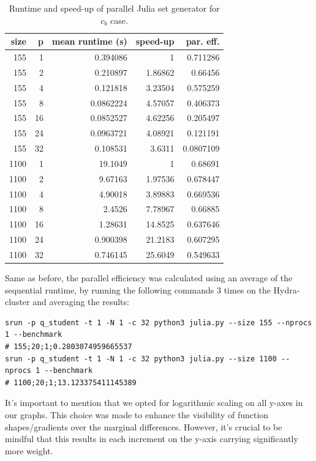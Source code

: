 \documentclass[a4paper,%
11pt,%
DIV12,
headsepline,%
headings=normal,
]{scrartcl}
\begin{document}
\begin{table}[htb!]
 \centering 
\caption{\label{tab:runtime_cb}Runtime and speed-up of parallel Julia set generator for $c_b$ case.}
\begin{tabular}{rrrrr}
  \toprule
  size & p & mean runtime (s) & speed-up & par. eff.\\
  \midrule
  155  & 1   & 0.394086         & 1        & 0.711286  \\
  155  & 2   & 0.210897         & 1.86862  & 0.66456   \\
  155  & 4   & 0.121818         & 3.23504  & 0.575259  \\
  155  & 8   & 0.0862224        & 4.57057  & 0.406373  \\
  155  & 16  & 0.0852527        & 4.62256  & 0.205497  \\
  155  & 24  & 0.0963721        & 4.08921  & 0.121191  \\
  155  & 32  & 0.108531         & 3.6311   & 0.0807109 \\
  1100 & 1   & 19.1049          & 1        & 0.68691   \\
  1100 & 2   & 9.67163          & 1.97536  & 0.678447  \\
  1100 & 4   & 4.90018          & 3.89883  & 0.669536  \\
  1100 & 8   & 2.4526           & 7.78967  & 0.66885   \\
  1100 & 16  & 1.28631          & 14.8525  & 0.637646  \\
  1100 & 24  & 0.900398         & 21.2183  & 0.607295  \\
  1100 & 32  & 0.746145         & 25.6049  & 0.549633  \\
  \bottomrule
\end{tabular}
\end{table}

Same as before, the parallel efficiency was calculated using an average of the sequential runtime, by running the following commands 3 times on the Hydra-cluster and averaging the results:

\begin{verbatim}
srun -p q_student -t 1 -N 1 -c 32 python3 julia.py --size 155 --nprocs 1 --benchmark 
# 155;20;1;0.2803074959665537
srun -p q_student -t 1 -N 1 -c 32 python3 julia.py --size 1100 --nprocs 1 --benchmark 
# 1100;20;1;13.123375411145389
\end{verbatim}

It's important to mention that we opted for logarithmic scaling on all y-axes in our graphs. This choice was made to enhance the visibility of function shapes/gradients over the marginal differences. However, it's crucial to be mindful that this results in each increment on the y-axis carrying significantly more weight.
\end{document}
